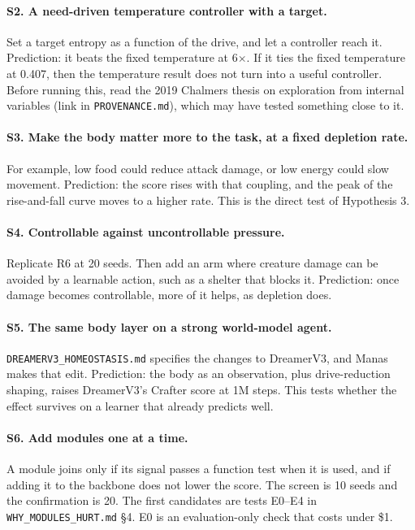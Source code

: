 \documentclass[11pt]{article}
\begin{document}
\paragraph{S2. A need-driven temperature controller with a target.}
Set a target entropy as a function of the drive, and let a controller reach it. Prediction: it beats the fixed temperature at 6$\times$. If it ties the fixed temperature at 0.407, then the temperature result does not turn into a useful controller. Before running this, read the 2019 Chalmers thesis on exploration from internal variables (link in \texttt{PROVENANCE.md}), which may have tested something close to it.

\paragraph{S3. Make the body matter more to the task, at a fixed depletion rate.}
For example, low food could reduce attack damage, or low energy could slow movement. Prediction: the score rises with that coupling, and the peak of the rise-and-fall curve moves to a higher rate. This is the direct test of Hypothesis 3.

\paragraph{S4. Controllable against uncontrollable pressure.}
Replicate R6 at 20 seeds. Then add an arm where creature damage can be avoided by a learnable action, such as a shelter that blocks it. Prediction: once damage becomes controllable, more of it helps, as depletion does.

\paragraph{S5. The same body layer on a strong world-model agent.}
\texttt{DREAMERV3\_HOMEOSTASIS.md} specifies the changes to DreamerV3, and Manas makes that edit. Prediction: the body as an observation, plus drive-reduction shaping, raises DreamerV3's Crafter score at 1M steps. This tests whether the effect survives on a learner that already predicts well.

\paragraph{S6. Add modules one at a time.}
A module joins only if its signal passes a function test when it is used, and if adding it to the backbone does not lower the score. The screen is 10 seeds and the confirmation is 20. The first candidates are tests E0--E4 in \texttt{WHY\_MODULES\_HURT.md} §4. E0 is an evaluation-only check that costs under \$1.
\end{document}
